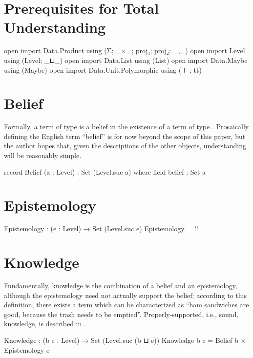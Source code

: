 \documentclass{article}
\begin{document}
\section{Prerequisites for Total Understanding}

\begin{code}
open import Data.Product using (Σ; _×_; proj₁; proj₂; _,_)
open import Level using (Level; _⊔_)
open import Data.List using (List)
open import Data.Maybe using (Maybe)
open import Data.Unit.Polymorphic using (⊤ ; tt)
\end{code}

\section{Belief}
Formally, a term  of type   is a belief in the existence of a term of type  .  Prosaically defining the English term ``belief'' is for now beyond the scope of this paper, but the author hopes that, given the descriptions of the other objects, understanding  will be reasonably simple.

\begin{code}
record Belief (a : Level) : Set (Level.suc a) where
  field
    belief : Set a
\end{code}

\section{Epistemology}

\begin{code}
Epistemology : (e : Level) → Set (Level.suc e)
Epistemology = {!!}
\end{code}

\section{Knowledge}
Fundamentally, knowledge is the combination of a belief and an epistemology, although the epistemology need not actually support the belief; according to this definition, there exists a  term which can be characterized as ``ham sandwiches are good, because the trash needs to be emptied''.  Properly-supported, i.e., sound, knowledge, is described in .

\begin{code}
Knowledge : (b e : Level) → Set (Level.suc (b ⊔ e))
Knowledge b e = Belief b × Epistemology e
\end{code}
\end{document}
